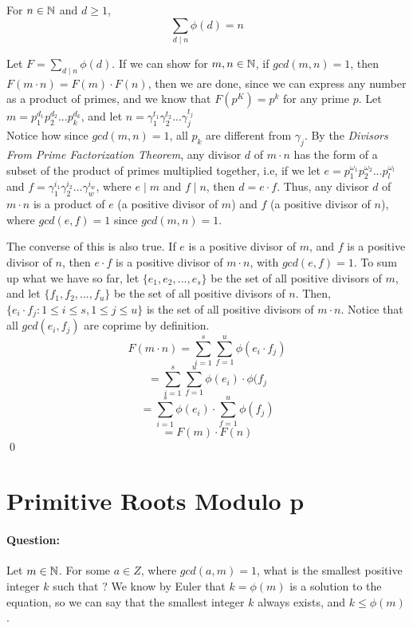 \documentclass[../main.tex]{subfiles}
\begin{document}
\begin{thm}
    For $n \in \mathbb{N}$ and $d \geq 1$,
    $$\sum_{d \mid n}\phi(d)=n$$
\end{thm}
\begin{pf}
    Let $F=\sum_{d \mid n}\phi(d)$. \sspace
    If we can show for $m,n \in \mathbb{N}$, if $gcd(m,n)=1$, then $F(m\cdot n)=F(m)\cdot F(n)$, then we are done, since we can express any number as a product of primes, and we know that $F(p^K)=p^k$ for any prime $p$. \sspace
    Let $m=p_1^{d_1}p_2^{d_2}...p_k^{d_k}$, and let $n=\gamma_1^{t_1}\gamma_2^{t_2}...\gamma_j^{t_j}$ \\
    Notice how since $gcd(m,n)=1$, all $p_k$ are different from $\gamma_j$. By the \textit{Divisors From Prime Factorization Theorem}, any divisor $d$ of $m \cdot n$ has the form of a subset of the product of primes multiplied together, i.e, if we let $e=p_1^{\omega_1}p_2^{\omega_2}...p_l^{\omega_l}$ and $f=\gamma_1^{i_1}\gamma_2^{i_2}...\gamma_w^{i_w}$, where $e \mid m$ and $f \mid n$, then $d=e \cdot f$. \sspace
    Thus, any divisor $d$ of $m \cdot n$ is a product of $e$ (a positive divisor of $m$) and $f$ (a positive divisor of $n$), where $gcd(e,f)=1$ since $gcd(m,n)=1$.
\end{pf}
\begin{pf}[cont.]
     The converse of this is also true. If $e$ is a positive divisor of $m$, and $f$ is a positive divisor of $n$, then $e\cdot f$ is a positive divisor of $m \cdot n$, with $gcd(e,f)=1$. \sspace
    To sum up what we have so far, let $\{e_1,e_2,...,e_s\}$ be the set of all positive divisors of $m$, and let $\{f_1,f_2,...,f_u\}$ be the set of all positive divisors of $n$. Then, $\{e_i\cdot f_j:1\leq i \leq s, 1 \leq j \leq u\}$ is the set of all positive divisors of $m\cdot n$. Notice that all $gcd(e_i,f_j)$ are coprime by definition.
    $$F(m\cdot n)=\sum_{i=1}^s \sum_{f=1}^u \phi(e_i \cdot f_j)$$
    $$=\sum_{i=1}^s \sum_{f=1}^u \phi(e_i) \cdot \phi(f_j$$
    $$=\sum_{i=1}^s \phi(e_i) \cdot \sum_{f=1}^u \phi(f_j)$$
    $$=F(m)\cdot F(n)$$ \qed
\end{pf}

\section{Primitive Roots Modulo p}
\paragraph{Question:}
Let $m \in \mathbb{N}$. For some $a \in Z$, where $gcd(a,m)=1$, what is the smallest positive integer $k$ such that ? \sspace
We know by Euler that $k=\phi(m)$ is a solution to the equation, so we can say that the smallest integer $k$ always exists, and $k \leq \phi(m)$.
\end{document}
